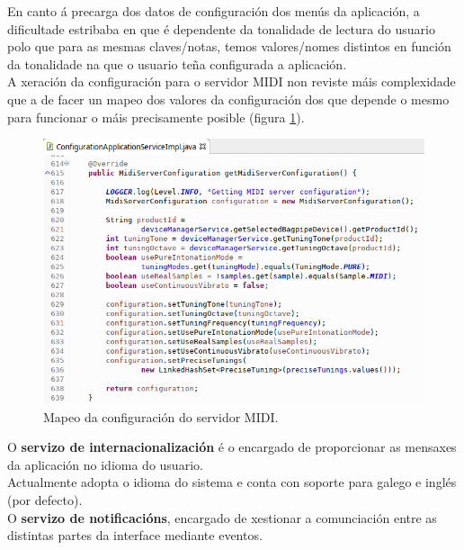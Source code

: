    En canto á precarga dos datos de configuración dos menús da aplicación, a
   dificultade estribaba en que é dependente da tonalidade de lectura do usuario
   polo que para as mesmas claves/notas, temos valores/nomes distintos en
   función da tonalidade na que o usuario teña configurada a aplicación. \\
   
   A xeración da configuración para o servidor MIDI non reviste máis
   complexidade que a de facer un mapeo dos valores da configuración dos que
   depende o mesmo para funcionar o máis precisamente posible (figura
   \ref{figura:MapeoConfiguracionServidorMIDI}). \\
   
   \begin{figure}[htbp]
    \centering
    \includegraphics[scale=0.6, keepaspectratio=true]{./imagenes/mapeo-conf-servidor-midi.png}
    \caption{Mapeo da configuración do servidor MIDI.}
    \label{figura:MapeoConfiguracionServidorMIDI}
   \end{figure}
   
   O \textbf{servizo de internacionalización} é o encargado de proporcionar as
   mensaxes da aplicación no idioma do usuario. \\
   
   Actualmente adopta o idioma do sistema e conta con soporte para galego e
   inglés (por defecto). \\
   
   O \textbf{servizo de notificacións}, encargado de xestionar a comunciación
   entre as distintas partes da interface mediante eventos. \\
   
